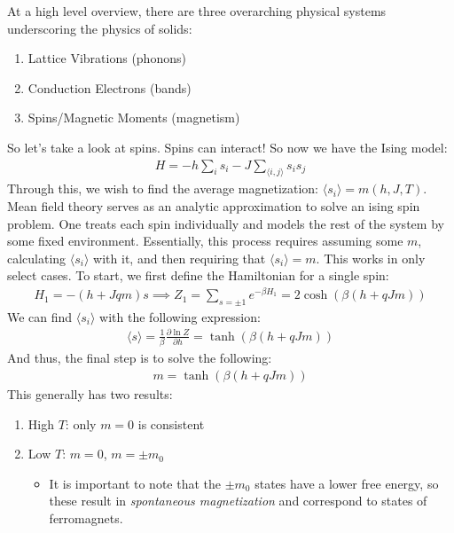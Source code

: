 \documentclass{article}
\begin{document}
At a high level overview, there are three overarching physical systems underscoring the physics of solids:
\begin{enumerate}
\item Lattice Vibrations (phonons)
\item Conduction Electrons (bands)
\item Spins/Magnetic Moments (magnetism)
\end{enumerate}
So let's take a look at spins.
\gap
{} Spins can interact! So now we have the Ising model:
\begin{align*}
  H = -h \sum_{i} s_i - J \sum_{\langle i, j \rangle} s_i s_j
\end{align*}
Through this, we wish to find the average magnetization: $\langle s_i \rangle = m(h, J, T)$.
\gap
{} Mean field theory serves as an analytic approximation to solve an ising spin problem. One treats each spin individually and models the rest of the system by some fixed environment. Essentially, this process requires assuming some $m$, calculating $\langle s_i \rangle$ with it, and then requiring that $\langle s_i \rangle = m$. This works in only select cases. To start, we first define the Hamiltonian for a single spin:
\begin{align*}
  H_1 = -(h + Jqm)s \implies Z_1 = \sum_{s = \pm 1}e^{-\beta H_1} = 2 \cosh \left(\beta(h + qJm)\right)
\end{align*}
We can find $\langle s_i \rangle$ with the following expression:
\begin{align*}
  \langle s \rangle = \frac{1}{\beta} \frac{\partial \ln Z}{\partial h} = \tanh \left(\beta (h + qJm)\right)
\end{align*}
And thus, the final step is to solve the following:
\begin{align*}
  m = \tanh \left( \beta (h + qJm)\right)
\end{align*}
This generally has two results:
\begin{enumerate}
\item High $T$: only $m = 0$ is consistent
\item Low $T$: $m = 0$, $m = \pm m_0$
  \begin{itemize}
  \item It is important to note that the $\pm m_0$ states have a lower free energy, so these result in \textit{spontaneous magnetization} and correspond to states of ferromagnets.
  \end{itemize}
\end{enumerate}
\end{document}
